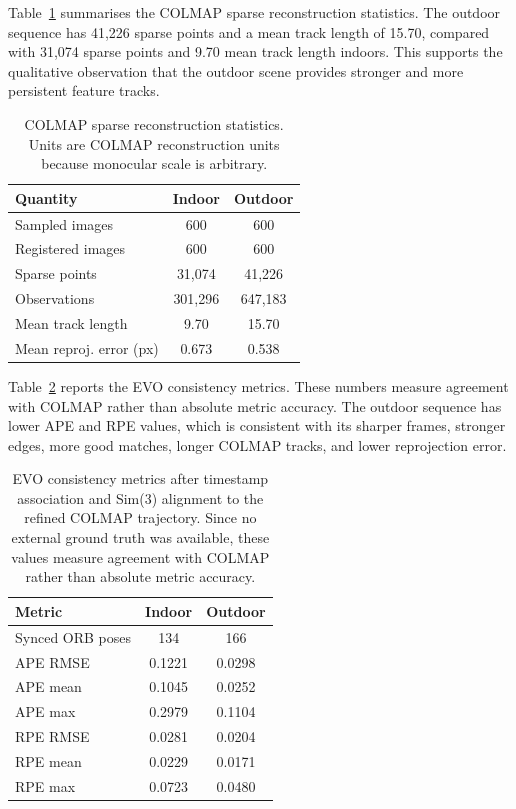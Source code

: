 \documentclass[conference]{IEEEtran}
\begin{document}
Table~\ref{tab:q2_colmap_stats} summarises the COLMAP sparse reconstruction statistics. The outdoor sequence has 41,226 sparse points and a mean track length of 15.70, compared with 31,074 sparse points and 9.70 mean track length indoors. This supports the qualitative observation that the outdoor scene provides stronger and more persistent feature tracks.

\begin{table}[!t]
\caption{COLMAP sparse reconstruction statistics. Units are COLMAP reconstruction units because monocular scale is arbitrary.}
\centering
\footnotesize
\begin{tabular}{lcc}
\toprule
Quantity & Indoor & Outdoor \\
\midrule
Sampled images & 600 & 600 \\
Registered images & 600 & 600 \\
Sparse points & 31,074 & 41,226 \\
Observations & 301,296 & 647,183 \\
Mean track length & 9.70 & 15.70 \\
Mean reproj. error (px) & 0.673 & 0.538 \\
\bottomrule
\end{tabular}
\label{tab:q2_colmap_stats}
\end{table}

Table~\ref{tab:q2_evo_metrics} reports the EVO consistency metrics. These numbers measure agreement with COLMAP rather than absolute metric accuracy. The outdoor sequence has lower APE and RPE values, which is consistent with its sharper frames, stronger edges, more good matches, longer COLMAP tracks, and lower reprojection error.

\begin{table}[!t]
\caption{EVO consistency metrics after timestamp association and Sim(3) alignment to the refined COLMAP trajectory. Since no external ground truth was available, these values measure agreement with COLMAP rather than absolute metric accuracy.}
\centering
\footnotesize
\begin{tabular}{lcc}
\toprule
Metric & Indoor & Outdoor \\
\midrule
Synced ORB poses & 134 & 166 \\
APE RMSE & 0.1221 & 0.0298 \\
APE mean & 0.1045 & 0.0252 \\
APE max & 0.2979 & 0.1104 \\
RPE RMSE & 0.0281 & 0.0204 \\
RPE mean & 0.0229 & 0.0171 \\
RPE max & 0.0723 & 0.0480 \\
\bottomrule
\end{tabular}
\label{tab:q2_evo_metrics}
\end{table}
\end{document}

